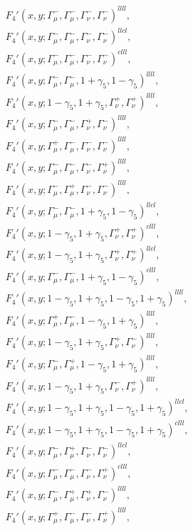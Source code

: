 \begin{align*}
&F_4'(x,y;\Gamma_\mu^-,\Gamma_\mu^-,\Gamma_\nu^-,\Gamma_\nu^-)^{llll},\\
&F_4'(x,y;\Gamma_\mu^-,\Gamma_\mu^-,\Gamma_\nu^-,\Gamma_\nu^-)^{llcl},\\
&F_4'(x,y;\Gamma_\mu^-,\Gamma_\mu^-,\Gamma_\nu^-,\Gamma_\nu^-)^{clll},\\
&F_4'(x,y;\Gamma_\mu^-,\Gamma_\mu^-,1+\gamma_5,1-\gamma_5)^{llll},\\
&F_4'(x,y;1-\gamma_5,1+\gamma_5,\Gamma_\nu^+,\Gamma_\nu^+)^{llll},\\
&F_4'(x,y;\Gamma_\mu^-,\Gamma_\mu^-,\Gamma_\nu^+,\Gamma_\nu^-)^{llll},\\
&F_4'(x,y;\Gamma_\mu^+,\Gamma_\mu^-,\Gamma_\nu^-,\Gamma_\nu^-)^{llll},\\
&F_4'(x,y;\Gamma_\mu^-,\Gamma_\mu^-,\Gamma_\nu^-,\Gamma_\nu^+)^{llll},\\
&F_4'(x,y;\Gamma_\mu^-,\Gamma_\mu^+,\Gamma_\nu^-,\Gamma_\nu^-)^{llll},\\
&F_4'(x,y;\Gamma_\mu^-,\Gamma_\mu^-,1+\gamma_5,1-\gamma_5)^{llcl},\\
&F_4'(x,y;1-\gamma_5,1+\gamma_5,\Gamma_\nu^+,\Gamma_\nu^+)^{clll},\\
&F_4'(x,y;1-\gamma_5,1+\gamma_5,\Gamma_\nu^+,\Gamma_\nu^+)^{llcl},\\
&F_4'(x,y;\Gamma_\mu^-,\Gamma_\mu^-,1+\gamma_5,1-\gamma_5)^{clll},\\
&F_4'(x,y;1-\gamma_5,1+\gamma_5,1-\gamma_5,1+\gamma_5)^{llll},\\
&F_4'(x,y;\Gamma_\mu^+,\Gamma_\mu^-,1-\gamma_5,1+\gamma_5)^{llll},\\
&F_4'(x,y;1-\gamma_5,1+\gamma_5,\Gamma_\nu^+,\Gamma_\nu^-)^{llll},\\
&F_4'(x,y;\Gamma_\mu^-,\Gamma_\mu^+,1-\gamma_5,1+\gamma_5)^{llll},\\
&F_4'(x,y;1-\gamma_5,1+\gamma_5,\Gamma_\nu^-,\Gamma_\nu^+)^{llll},\\
&F_4'(x,y;1-\gamma_5,1+\gamma_5,1-\gamma_5,1+\gamma_5)^{llcl},\\
&F_4'(x,y;1-\gamma_5,1+\gamma_5,1-\gamma_5,1+\gamma_5)^{clll},\\
&F_4'(x,y;\Gamma_\mu^-,\Gamma_\mu^+,\Gamma_\nu^-,\Gamma_\nu^-)^{llcl},\\
&F_4'(x,y;\Gamma_\mu^-,\Gamma_\mu^-,\Gamma_\nu^-,\Gamma_\nu^+)^{clll},\\
&F_4'(x,y;\Gamma_\mu^-,\Gamma_\mu^+,\Gamma_\nu^+,\Gamma_\nu^-)^{llll},\\
&F_4'(x,y;\Gamma_\mu^+,\Gamma_\mu^-,\Gamma_\nu^-,\Gamma_\nu^+)^{llll},\\

\end{align*}
